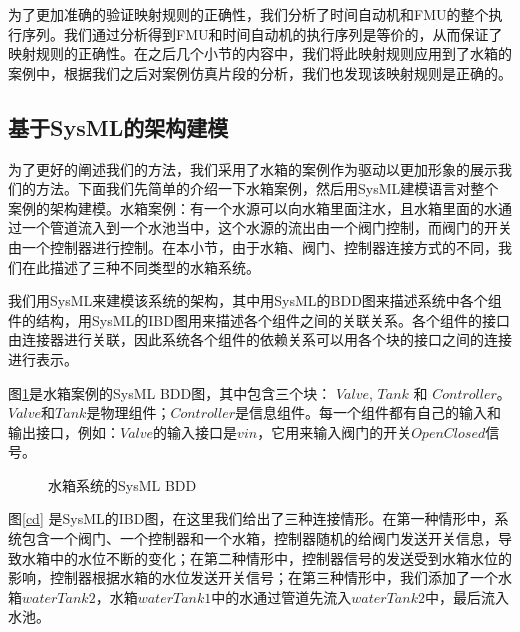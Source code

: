 为了更加准确的验证映射规则的正确性，我们分析了时间自动机和FMU的整个执行序列。我们通过分析得到FMU和时间自动机的执行序列是等价的，从而保证了映射规则的正确性。在之后几个小节的内容中，我们将此映射规则应用到了水箱的案例中，根据我们之后对案例仿真片段的分析，我们也发现该映射规则是正确的。 
\subsection{基于SysML的架构建模} 
为了更好的阐述我们的方法，我们采用了水箱的案例\cite{Am2016Checking}作为驱动以更加形象的展示我们的方法。下面我们先简单的介绍一下水箱案例，然后用SysML建模语言对整个案例的架构建模。水箱案例：有一个水源可以向水箱里面注水，且水箱里面的水通过一个管道流入到一个水池当中，这个水源的流出由一个阀门控制，而阀门的开关由一个控制器进行控制。在本小节，由于水箱、阀门、控制器连接方式的不同，我们在此描述了三种不同类型的水箱系统。

我们用SysML来建模该系统的架构，其中用SysML的BDD图来描述系统中各个组件的结构，用SysML的IBD图用来描述各个组件之间的关联关系。各个组件的接口由连接器进行关联，因此系统各个组件的依赖关系可以用各个块的接口之间的连接进行表示。

图\ref{myad}是水箱案例的SysML BDD图，其中包含三个块： $Valve$, $Tank$ 和 $Controller$。 $Valve$和$Tank$是物理组件；$Controller$是信息组件。每一个组件都有自己的输入和输出接口，例如：$Valve$的输入接口是$vin$，它用来输入阀门的开关$OpenClosed$信号。
\begin{figure}[htbp]
	\caption{水箱系统的SysML BDD}
	\label{myad}
\end{figure}

图\ref{cd} 是SysML的IBD图，在这里我们给出了三种连接情形。在第一种情形中，系统包含一个阀门、一个控制器和一个水箱，控制器随机的给阀门发送开关信息，导致水箱中的水位不断的变化；在第二种情形中，控制器信号的发送受到水箱水位的影响，控制器根据水箱的水位发送开关信号；在第三种情形中，我们添加了一个水箱$waterTank2$，水箱$waterTank1$中的水通过管道先流入$waterTank2$中，最后流入水池。

